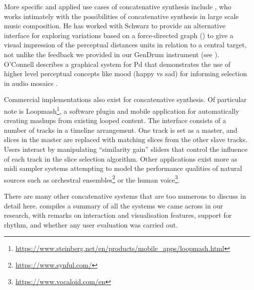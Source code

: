 More specific and applied use cases of concatenative synthesis include \cite{Hackbarth2010}, who works intimately with the possibilities of concatenative synthesis in large scale music composition. He has worked with Schwarz to provide an alternative interface for exploring variations based on a force-directed graph () to give a visual impression of the perceptual distances units in relation to a central target, not unlike the feedback we provided in our GenDrum instrument (see ). O’Connell describes a graphical system for Pd that demonstrates the use of higher level perceptual concepts like mood (happy vs sad) for informing selection in audio mosaics \citep{OConnell2011}.

Commercial implementations also exist for concatenative synthesis. Of particular note is Loopmash\footnote{\url{https://www.steinberg.net/en/products/mobile_apps/loopmash.html}}, a software plugin and mobile application for automatically creating mashups from existing looped content. The interface consists of a number of tracks in a timeline arrangement. One track is set as a master, and slices in the master are replaced with matching slices from the other slave tracks. Users interact by manipulating “similarity gain” sliders that control the influence of each track in the slice selection algorithm. Other applications exist more as \acrshort{midi} sampler systems attempting to model the performance qualities of natural sources such as orchestral ensembles\footnote{\url{https://www.synful.com/}} or the human voice\footnote{\url{https://www.vocaloid.com/en}}.

There are many other concatenative systems that are too numerous to discuss in detail here.  compiles a summary of all the systems we came across in our research, with remarks on interaction and visualisation features, support for rhythm, and whether any user evaluation was carried out.

\newpage
\thispagestyle{empty}
\mbox{}



